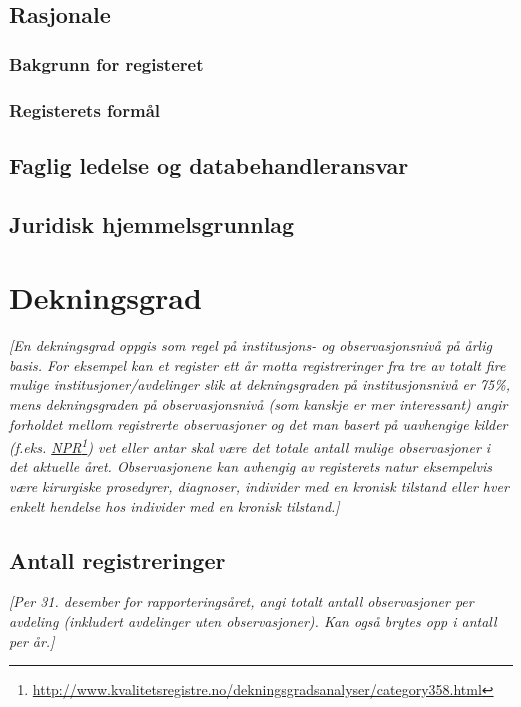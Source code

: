 \documentclass[norsk, a4paper, twocolumn]{report}
\newcommand{\guide}[1] {
	\textit{[\textcolor{guidegray}{#1}]}
	}
\begin{document}
\section{Rasjonale}\label{cha:ras}
\subsection{Bakgrunn for registeret}\label{sec:bak}
\subsection{Registerets formål}\label{sec:for}

\section{Faglig ledelse og databehandleransvar}\label{cha:led}
\section{Juridisk hjemmelsgrunnlag}\label{cha:jur}


\chapter{Dekningsgrad}\label{cha:dek}
\guide{En dekningsgrad oppgis som regel på institusjons- og observasjonsnivå på 
årlig basis. For eksempel kan et register ett år motta registreringer fra tre
av totalt fire mulige institusjoner/avdelinger slik at dekningsgraden på
institusjonsnivå er 75\%, mens dekningsgraden på observasjonsnivå 
(som kanskje er mer interessant) angir
forholdet mellom registrerte observasjoner og det man basert på uavhengige
kilder (f.eks.
\href{http://www.kvalitetsregistre.no/dekningsgradsanalyser/category358.html}
{NPR}\footnote{\url{http://www.kvalitetsregistre.no/dekningsgradsanalyser/category358.html}})
vet eller antar skal være det totale antall mulige
observasjoner i det aktuelle året. Observasjonene kan avhengig av registerets
natur eksempelvis være kirurgiske prosedyrer, diagnoser, individer med en 
kronisk tilstand eller hver enkelt hendelse hos individer med en kronisk
tilstand.}

\section{Antall registreringer}\label{sec:reg}
\guide{Per 31. desember for rapporteringsåret, angi totalt antall
observasjoner per avdeling (inkludert avdelinger uten observasjoner). Kan
også brytes opp i antall per år.}
\end{document}
